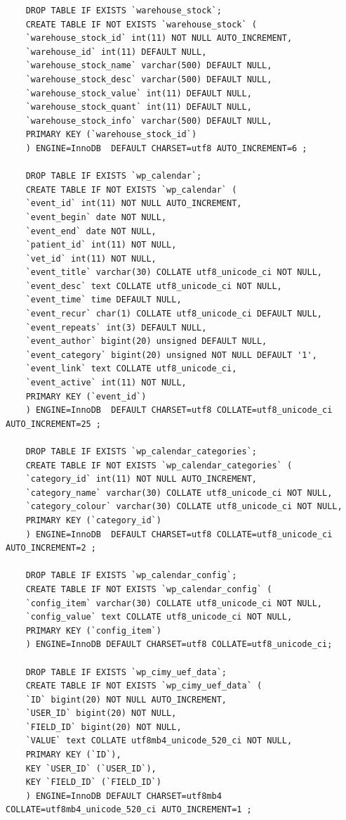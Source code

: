 \documentclass[10pt,a4paper]{article}
\begin{document}
\begin{lstlisting}
	DROP TABLE IF EXISTS `warehouse_stock`;
	CREATE TABLE IF NOT EXISTS `warehouse_stock` (
	`warehouse_stock_id` int(11) NOT NULL AUTO_INCREMENT,
	`warehouse_id` int(11) DEFAULT NULL,
	`warehouse_stock_name` varchar(500) DEFAULT NULL,
	`warehouse_stock_desc` varchar(500) DEFAULT NULL,
	`warehouse_stock_value` int(11) DEFAULT NULL,
	`warehouse_stock_quant` int(11) DEFAULT NULL,
	`warehouse_stock_info` varchar(500) DEFAULT NULL,
	PRIMARY KEY (`warehouse_stock_id`)
	) ENGINE=InnoDB  DEFAULT CHARSET=utf8 AUTO_INCREMENT=6 ;
	
	DROP TABLE IF EXISTS `wp_calendar`;
	CREATE TABLE IF NOT EXISTS `wp_calendar` (
	`event_id` int(11) NOT NULL AUTO_INCREMENT,
	`event_begin` date NOT NULL,
	`event_end` date NOT NULL,
	`patient_id` int(11) NOT NULL,
	`vet_id` int(11) NOT NULL,
	`event_title` varchar(30) COLLATE utf8_unicode_ci NOT NULL,
	`event_desc` text COLLATE utf8_unicode_ci NOT NULL,
	`event_time` time DEFAULT NULL,
	`event_recur` char(1) COLLATE utf8_unicode_ci DEFAULT NULL,
	`event_repeats` int(3) DEFAULT NULL,
	`event_author` bigint(20) unsigned DEFAULT NULL,
	`event_category` bigint(20) unsigned NOT NULL DEFAULT '1',
	`event_link` text COLLATE utf8_unicode_ci,
	`event_active` int(11) NOT NULL,
	PRIMARY KEY (`event_id`)
	) ENGINE=InnoDB  DEFAULT CHARSET=utf8 COLLATE=utf8_unicode_ci AUTO_INCREMENT=25 ;
	
	DROP TABLE IF EXISTS `wp_calendar_categories`;
	CREATE TABLE IF NOT EXISTS `wp_calendar_categories` (
	`category_id` int(11) NOT NULL AUTO_INCREMENT,
	`category_name` varchar(30) COLLATE utf8_unicode_ci NOT NULL,
	`category_colour` varchar(30) COLLATE utf8_unicode_ci NOT NULL,
	PRIMARY KEY (`category_id`)
	) ENGINE=InnoDB  DEFAULT CHARSET=utf8 COLLATE=utf8_unicode_ci AUTO_INCREMENT=2 ;
	
	DROP TABLE IF EXISTS `wp_calendar_config`;
	CREATE TABLE IF NOT EXISTS `wp_calendar_config` (
	`config_item` varchar(30) COLLATE utf8_unicode_ci NOT NULL,
	`config_value` text COLLATE utf8_unicode_ci NOT NULL,
	PRIMARY KEY (`config_item`)
	) ENGINE=InnoDB DEFAULT CHARSET=utf8 COLLATE=utf8_unicode_ci;
	
	DROP TABLE IF EXISTS `wp_cimy_uef_data`;
	CREATE TABLE IF NOT EXISTS `wp_cimy_uef_data` (
	`ID` bigint(20) NOT NULL AUTO_INCREMENT,
	`USER_ID` bigint(20) NOT NULL,
	`FIELD_ID` bigint(20) NOT NULL,
	`VALUE` text COLLATE utf8mb4_unicode_520_ci NOT NULL,
	PRIMARY KEY (`ID`),
	KEY `USER_ID` (`USER_ID`),
	KEY `FIELD_ID` (`FIELD_ID`)
	) ENGINE=InnoDB DEFAULT CHARSET=utf8mb4 COLLATE=utf8mb4_unicode_520_ci AUTO_INCREMENT=1 ;
	

\end{lstlisting}
\end{document}
